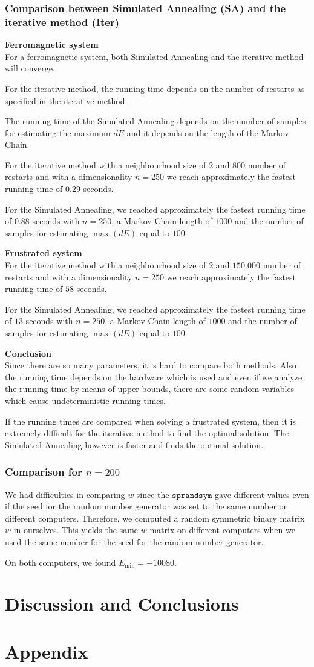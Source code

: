 \documentclass[10pt,a4paper]{article}
\begin{document}
\subsubsection{Comparison between Simulated Annealing (SA) and the iterative method (Iter)}

\textbf{Ferromagnetic system}\\
For a ferromagnetic system, both Simulated Annealing and the iterative method will converge.

For the iterative method, the running time depends on the number of restarts as specified in the iterative method.

The running time of the Simulated Annealing depends on the number of samples for estimating the maximum $dE$ and it depends on the length of the Markov Chain.

For the iterative method with a neighbourhood size of $2$ and $800$ number of restarts and with a dimensionality $n=250$ we reach approximately the fastest running time of $0.29$ seconds.

For the Simulated Annealing, we reached approximately the fastest running time of $0.88$ seconds with $n=250$, a Markov Chain length of $1000$ and the number of samples for estimating $\max(dE)$ equal to $100$.

\textbf{Frustrated system}\\
For the iterative method with a neighbourhood size of $2$ and $150.000$ number of restarts and with a dimensionality $n=250$ we reach approximately the fastest running time of $58$ seconds.

For the Simulated Annealing, we reached approximately the fastest running time of $13$ seconds with $n=250$, a Markov Chain length of $1000$ and the number of samples for estimating $\max(dE)$ equal to $100$.

\textbf{Conclusion}\\
Since there are so many parameters, it is hard to compare both methods. Also the running time depends on the hardware which is used and even if we analyze the running time by means of upper bounds, there are some random variables which cause undeterministic running times.

If the running times are compared when solving a frustrated system, then it is extremely difficult for the iterative method to find the optimal solution. The Simulated Annealing however is faster and finds the optimal solution.

\subsubsection{Comparison for $n=200$}
We had difficulties in comparing $w$ since the $\texttt{sprandsym}$ gave different values even if the seed for the random number generator was set to the same number on different computers. Therefore, we computed a random symmetric binary matrix $w$ in ourselves. This yields the same $w$ matrix on different computers when we used the same number for the seed for the random number generator.

On both computers, we found $E_{\min} = -10080$.

\section{Discussion and Conclusions}

\newpage
\section{Appendix}
\end{document}
